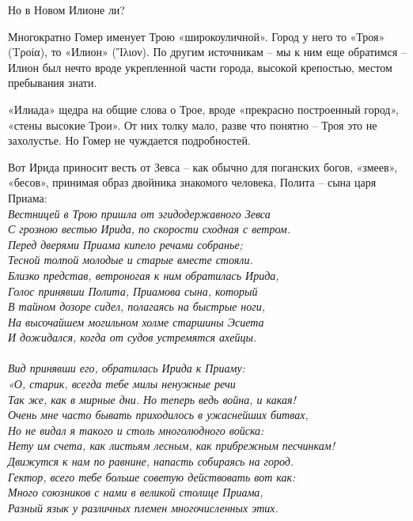 Но в Новом Илионе ли?

Многократно Гомер именует Трою «широкоуличной». Город у него то «Троя» (Τροία), то «Илион» (Ἴλιον). По другим источникам – мы к ним еще обратимся – Илион был нечто вроде укрепленной части города, высокой крепостью, местом пребывания знати.

«Илиада» щедра на общие слова о Трое, вроде «прекрасно построенный город», «стены высокие Трои».  От них толку мало, разве что понятно – Троя это не захолустье. Но Гомер не чуждается подробностей.

Вот Ирида приносит весть от Зевса – как обычно для поганских богов, «змеев», «бесов», принимая образ двойника знакомого человека, Полита – сына царя Приама:\\

\noindent
\textit{Вестницей в Трою пришла от эгидодержавного Зевса\\
С грозною вестью Ирида, по скорости сходная с ветром.\\
Перед дверями Приама кипело речами собранье;\\
Тесной толпой молодые и старые вместе стояли.\\
Близко представ, ветроногая к ним обратилась Ирида,\\
Голос принявши Полита, Приамова сына, который\\
В тайном дозоре сидел, полагаясь на быстрые ноги,\\
На высочайшем могильном холме старшины Эсиета\\
И дожидался, когда от судов устремятся ахейцы.\\
\mbox{ }\\Вид принявши его, обратилась Ирида к Приаму:\\
«О, старик, всегда тебе милы ненужные речи\\
Так же, как в мирные дни. Но теперь ведь война, и какая!\\
Очень мне часто бывать приходилось в ужаснейших битвах,\\
Но не видал я такого и столь многолюдного войска:\\
Нету им счета, как листьям лесным, как прибрежным песчинкам!\\
Движутся к нам по равнине, напасть собираясь на город.\\
Гектор, всего тебе больше советую действовать вот как:\\
Много союзников с нами в великой столице Приама,\\
Разный язык у различных племен многочисленных этих.\\
}
